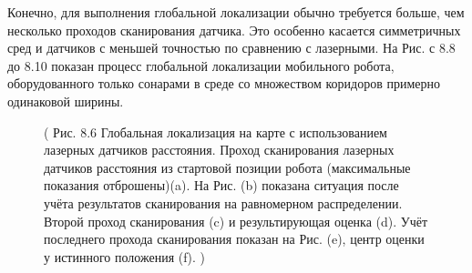 \documentclass[10pt,a4paper]{article}
\begin{document}
Конечно, для выполнения глобальной локализации обычно требуется больше, чем несколько проходов сканирования датчика. Это особенно касается симметричных сред и датчиков с меньшей точностью по сравнению с лазерными. На Рис. с 8.8 до 8.10 показан процесс глобальной локализации мобильного робота, оборудованного только сонарами в среде со множеством коридоров примерно одинаковой ширины. 

\begin{figure}[H]
	\caption{ ( Рис. 8.6 Глобальная локализация на карте с использованием лазерных датчиков расстояния.   Проход сканирования лазерных датчиков расстояния из стартовой позиции робота (максимальные показания отброшены)(a). На Рис. (b) показана ситуация после учёта результатов сканирования на равномерном распределении. Второй проход сканирования (c) и результирующая оценка (d). Учёт последнего прохода сканирования показан на Рис. (e), центр оценки у истинного положения (f). )}
	\label{fig:86orig}
\end{figure}
\end{document}
